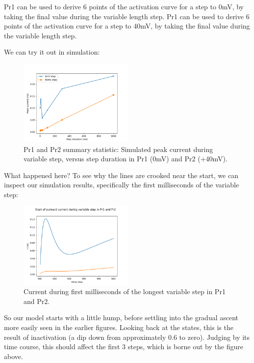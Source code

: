 \documentclass[preprint,authoryear,10pt]{elsarticle}
\begin{document}
Pr1 can be used to derive 6 points of the activation curve for a step to 0mV,
 by taking the final value during the variable length step.
Pr1 can be used to derive 6 points of the activation curve for a step to 40mV,
 by taking the final value during the variable length step.

We can try it out in simulation:

\begin{figure}[H]
\centerline{
\includegraphics[width=0.5\textwidth]{fig/pr12-modified-stat}
}
\caption{%
Pr1 and Pr2 summary statistic:
Simulated peak current during variable step, versus step duration in Pr1 (0mV)
and Pr2 (+40mV).
}
\label{fig:analysis-pr12-stat}
\end{figure}

What happened here? To see why the lines are crooked near the start, we can
inspect our simulation results, specifically the first milliseconds of the
variable step:

\begin{figure}[H]
\centerline{
\includegraphics[width=0.5\textwidth]{fig/pr12-modified-step-start}
}
\caption{%
Current during first milliseconds of the longest variable step in Pr1 and Pr2.
}
\label{fig:analysis-pr12-step-start}
\end{figure}

So our model starts with a little hump, before settling into the gradual ascent
 more easily seen in the earlier figures.
Looking back at the states, this is the result of inactivation (a dip down from
 approximately 0.6 to zero).
Judging by its time course, this should affect the first 3 steps, which is
 borne out by the figure above.
\end{document}
